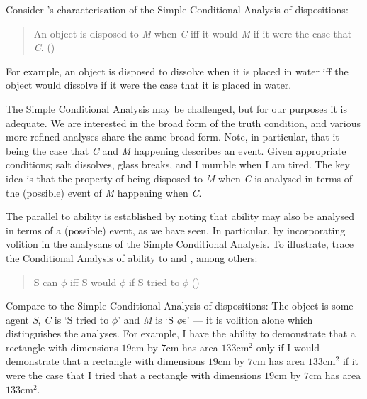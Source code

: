 \begin{note}
  Consider \citeauthor{Choi:2021wg}'s characterisation of the Simple Conditional Analysis of dispositions:
  \begin{quote}
    An object is disposed to \emph{M} when \emph{C} iff it would \emph{M} if it were the case that \emph{C}.\nolinebreak
    \mbox{}\hfill\mbox{(\Citeyear{Choi:2021wg})}
  \end{quote}
  For example, an object is disposed to dissolve when it is placed in water iff the object would dissolve if it were the case that it is placed in water.

  The Simple Conditional Analysis may be challenged, but for our purposes it is adequate.
  We are interested in the broad form of the truth condition, and various more refined analyses share the same broad form.
  Note, in particular, that it being the case that \emph{C} and \emph{M} happening describes an event.
  Given appropriate conditions; salt dissolves, glass breaks, and I mumble when I am tired.
  The key idea is that the property of being disposed to \emph{M} when \emph{C} is analysed in terms of the (possible) event of \emph{M} happening when \emph{C}.

  The parallel to ability is established by noting that ability may also be analysed in terms of a (possible) event, as we have seen.
  In particular, by incorporating volition in the analysans of the Simple Conditional Analysis.
  To illustrate, \citeauthor{Mandelkern:2017aa} trace the Conditional Analysis of ability  to \textcite{Hume:1748tp} and \textcite{Moore:1912te}, among others:
  \begin{quote}
    S can \(\phi\) iff S would \(\phi\) if S tried to \(\phi\)\nolinebreak
    \mbox{}\hfill\mbox{(\Citeyear[Cf.][308]{Mandelkern:2017aa})}
  \end{quote}
  Compare to the Simple Conditional Analysis of dispositions:
  The object is some agent \emph{S}, \emph{C} is `S tried to \(\phi\)' and \emph{M} is `S \(\phi\)s' --- it is volition alone which distinguishes the analyses.
  For example, I have the ability to demonstrate that a rectangle with dimensions \(19\text{cm}\) by \(7\text{cm}\) has area \(133\text{cm}^{2}\) only if I would demonstrate that a rectangle with dimensions \(19\text{cm}\) by \(7\text{cm}\) has area \(133\text{cm}^{2}\) if it were the case that I tried that a rectangle with dimensions \(19\text{cm}\) by \(7\text{cm}\) has area \(133\text{cm}^{2}\).
\end{note}

